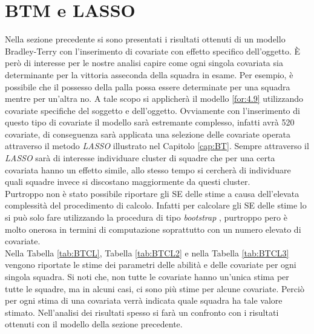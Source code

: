 \section{BTM e LASSO}
Nella sezione precedente si sono presentati i risultati ottenuti di un modello Bradley-Terry con l'inserimento di covariate con effetto specifico dell'oggetto. È però di interesse per le nostre analisi capire come ogni singola covariata sia determinante per la vittoria asseconda della squadra in esame. Per esempio, è possibile che il possesso della palla possa essere determinate per una squadra mentre per un'altra no. A tale scopo si applicherà il modello \ref{for:4.9} utilizzando covariate specifiche del soggetto e dell'oggetto. Ovviamente con l'inserimento di questo tipo di covariate il modello sarà estremante complesso, infatti avrà 520 covariate, di conseguenza sarà applicata una selezione delle covariate operata attraverso il metodo \emph{LASSO} illustrato nel Capitolo \ref{cap:BT}. Sempre attraverso il \emph{LASSO} sarà di interesse individuare cluster di squadre che per una certa covariata hanno un effetto simile, allo stesso tempo si cercherà di individuare quali squadre invece si discostano maggiormente da questi cluster.\\
Purtroppo non è stato possibile riportare gli SE delle stime a causa dell'elevata complessità del procedimento di calcolo. Infatti per calcolare gli SE delle stime lo si può solo fare utilizzando la procedura di tipo \emph{bootstrap} \autocite{henderson2005bootstrap}, purtroppo pero è molto onerosa in termini di computazione soprattutto con un numero elevato di covariate.\\
Nella Tabella \ref{tab:BTCL}, Tabella \ref{tab:BTCL2} e nella Tabella \ref{tab:BTCL3} vengono riportate le stime dei parametri delle abilità e delle covariate per ogni singola squadra. Si noti che, non tutte le covariate hanno un’unica stima per tutte le squadre, ma in alcuni casi, ci sono più stime per alcune covariate. Perciò per ogni stima di una covariata verrà indicata quale squadra ha tale valore stimato. Nell'analisi dei risultati spesso si farà un confronto con i risultati ottenuti con il modello della sezione precedente.

